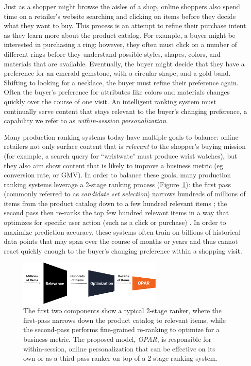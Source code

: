 \documentclass[11pt, dvipdfmx]{article}
\begin{document}
Just as a shopper might browse the aisles of a shop, online shoppers also spend time on a retailer's website searching and clicking on items before they decide what they want to buy. This process is an attempt to refine their purchase intent as they learn more about the product catalog. For example, a buyer might be interested in purchasing a ring; however, they often must click on a number of different rings before they understand possible styles, shapes, colors, and materials that are available. Eventually, the buyer might decide that they have a preference for an emerald gemstone, with a circular shape, and a gold band. Shifting to looking for a necklace, the buyer must refine their preference again.
Often the buyer's preference for attributes like colors and materials changes quickly over the course of one visit. An intelligent ranking system must continually serve content 
that stays relevant to the buyer's changing preference, a capability we refer to as \textit{within-session personalization}. 

Many production ranking systems today have multiple goals to balance: online retailers not only surface content that is \emph{relevant} to the shopper's buying mission (for example, a search query for ``wristwatc" must produce wrist watches), but they also aim show content that is likely to improve a business metric (eg. conversion rate, or GMV). In order to balance these goals, many production ranking systems leverage a 2-stage ranking process (Figure~\ref{fig:ranking_system}): the first pass (commonly referred to as \emph{candidate set selection}) narrows hundreds of millions of items from the product catalog down to a few hundred relevant items \cite{kdd20_facebook_search,kdd19_amazon_product_search, elnlp2020_itemInteraction}; the second pass then re-ranks the top few hundred relevant items in a way that optimizes for specific user action (such as a click or purchase) \cite{guo2020debiasing,kdd20_DNN_airbnb_search,pobrotyn2020contextaware,wu2018turning}. In order to maximize prediction accuracy, these systems often train on billions of historical data points that may span over the course of months or years and thus cannot react quickly enough to the buyer's changing preference within a shopping visit. 

\begin{figure}[!t]
    \centering
    \includegraphics[width=0.645\textwidth]{figs/fig_ranking_system2.pdf}
    \caption{The first two components show a typical 2-stage ranker, where the first-pass narrows down the product catalog to relevant items, while the second-pass performs fine-grained re-ranking to optimize for a business metric. The proposed model, \emph{OPAR}, is responsible for within-session, online personalization that can be effective on its own or as a third-pass ranker on top of a 2-stage ranking system.
    }
    \label{fig:ranking_system}
\end{figure}
\end{document}
